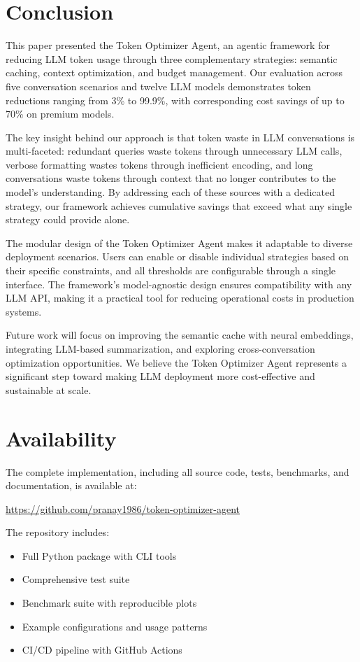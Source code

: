 \section{Conclusion}
\label{sec:conclusion}

This paper presented the Token Optimizer Agent, an agentic framework for reducing LLM token usage through three complementary strategies: semantic caching, context optimization, and budget management. Our evaluation across five conversation scenarios and twelve LLM models demonstrates token reductions ranging from 3\% to 99.9\%, with corresponding cost savings of up to 70\% on premium models.

The key insight behind our approach is that token waste in LLM conversations is multi-faceted: redundant queries waste tokens through unnecessary LLM calls, verbose formatting wastes tokens through inefficient encoding, and long conversations waste tokens through context that no longer contributes to the model's understanding. By addressing each of these sources with a dedicated strategy, our framework achieves cumulative savings that exceed what any single strategy could provide alone.

The modular design of the Token Optimizer Agent makes it adaptable to diverse deployment scenarios. Users can enable or disable individual strategies based on their specific constraints, and all thresholds are configurable through a single interface. The framework's model-agnostic design ensures compatibility with any LLM API, making it a practical tool for reducing operational costs in production systems.

Future work will focus on improving the semantic cache with neural embeddings, integrating LLM-based summarization, and exploring cross-conversation optimization opportunities. We believe the Token Optimizer Agent represents a significant step toward making LLM deployment more cost-effective and sustainable at scale.

\section*{Availability}

The complete implementation, including all source code, tests, benchmarks, and documentation, is available at:

\begin{center}
\url{https://github.com/pranay1986/token-optimizer-agent}
\end{center}

The repository includes:
\begin{itemize}[leftmargin=*]
    \item Full Python package with CLI tools
    \item Comprehensive test suite
    \item Benchmark suite with reproducible plots
    \item Example configurations and usage patterns
    \item CI/CD pipeline with GitHub Actions
\end{itemize}
